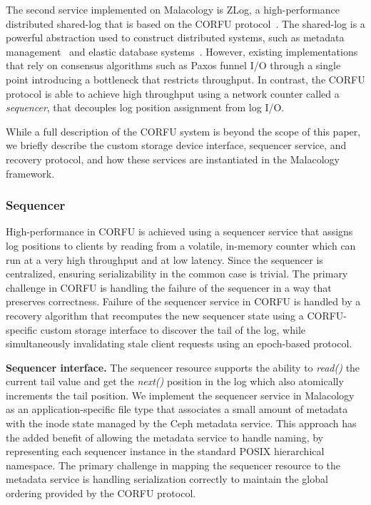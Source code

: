 \documentclass[preprint]{sigplanconf-eurosys}
\begin{document}
The second service implemented on Malacology is ZLog, a high-performance
distributed shared-log that is based on the CORFU
protocol~\cite{balakrishnan_corfu_2012}. The shared-log is a
powerful abstraction used to construct distributed systems, such as
metadata management~\cite{balakrishnan:sosp13} and elastic database
systems~\cite{bernstein:cidr11,bernstein:vldb11,bernstein:sigmod15}.
However, existing implementations that rely on consensus algorithms such as
Paxos funnel I/O through a single point introducing a bottleneck that restricts
throughput. In contrast, the CORFU protocol is able to achieve high throughput
using a network counter called a \emph{sequencer}, that
decouples log position assignment from log I/O.

While a full description of the CORFU system is beyond the scope of this
paper, we briefly describe the custom storage device interface, sequencer
service, and recovery protocol, and how these services are instantiated in the
Malacology framework.

\subsubsection{Sequencer}
\label{sec:seq}

High-performance in CORFU is achieved using a sequencer service that assigns
log positions to clients by reading from a volatile, in-memory counter which
can run at a very high throughput and at low latency. Since the sequencer is
centralized, ensuring serializability in the common case is trivial.  The
primary challenge in CORFU is handling the failure of the sequencer in a way
that preserves correctness. Failure of the sequencer service in CORFU is
handled by a recovery algorithm that recomputes the new sequencer state using a
CORFU-specific custom storage interface to discover the tail of the log, while
simultaneously invalidating stale client requests using an epoch-based
protocol.

{\bf Sequencer interface.} The sequencer resource supports the ability to
\emph{read()} the current tail value and get the \emph{next()} position in
the log which also atomically increments the tail position.
We implement the sequencer service in Malacology as an application-specific
file type that associates a small amount of metadata
with the inode state managed by the Ceph metadata service.
This approach has the added
benefit of allowing the metadata service to handle naming, by
representing each sequencer instance in the standard POSIX hierarchical
namespace. The primary challenge in mapping the sequencer resource to the
metadata service is handling serialization correctly to maintain the global
ordering provided by the CORFU protocol.
\end{document}
